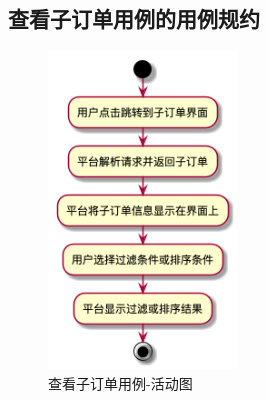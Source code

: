 \subsection{查看子订单用例的用例规约}
\begin{figure}[htp]
    \centering
    \includegraphics[width=5cm]{figure/usecase_v2/query_subOrder.png}
    \caption{查看子订单用例-活动图}
    \label{fig:uc_suborder_query}
\end{figure}

